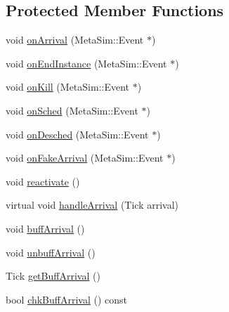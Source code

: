 \subsection*{Protected Member Functions}
\begin{DoxyCompactItemize}
\item 
void \hyperlink{classRTSim_1_1Task_ad0a923ebab41a60de56862fe682f12ef}{on\+Arrival} (Meta\+Sim\+::\+Event $\ast$)
\item 
void \hyperlink{classRTSim_1_1Task_a45c6a4336341c17beaba74179b168aee}{on\+End\+Instance} (Meta\+Sim\+::\+Event $\ast$)
\item 
void \hyperlink{classRTSim_1_1Task_a289ac955cd726ce9e586dc597716a07f}{on\+Kill} (Meta\+Sim\+::\+Event $\ast$)
\item 
void \hyperlink{classRTSim_1_1Task_a53445a7658aafbfc196b5b1606d6c164}{on\+Sched} (Meta\+Sim\+::\+Event $\ast$)
\item 
void \hyperlink{classRTSim_1_1Task_a9ffde13b8c973b567a9944b6afd11088}{on\+Desched} (Meta\+Sim\+::\+Event $\ast$)
\item 
void \hyperlink{classRTSim_1_1Task_aaa8710695a0f6dafa61f5e562f085bb7}{on\+Fake\+Arrival} (Meta\+Sim\+::\+Event $\ast$)
\item 
void \hyperlink{classRTSim_1_1Task_a06c287744e3a83bd1acac7567f60ec30}{reactivate} ()
\item 
virtual void \hyperlink{classRTSim_1_1Task_add22c413ce6d56bd33d7d6391f688658}{handle\+Arrival} (Tick arrival)
\item 
void \hyperlink{classRTSim_1_1Task_a72f9e2424fe1afe2c130c9d99abc84a7}{buff\+Arrival} ()
\item 
void \hyperlink{classRTSim_1_1Task_a8dbe1e0c2e2a529f8cfd42fb44446114}{unbuff\+Arrival} ()
\item 
Tick \hyperlink{classRTSim_1_1Task_ace91a7f999010a82997fcdd440153179}{get\+Buff\+Arrival} ()
\item 
bool \hyperlink{classRTSim_1_1Task_a61f87f30d18a4a83cc886f2a99b483c5}{chk\+Buff\+Arrival} () const 
\end{DoxyCompactItemize}
